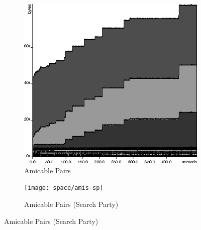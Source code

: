 \begin{figure}[t]
  \centering
  \begin{subfigure}{0.4\textwidth}
    \includegraphics[width=\textwidth]{space/amis-orig.eps}
    \caption{Amicable Pairs}
    \label{fig:searchparty-examples-space:amis-orig}
  \end{subfigure}
  \begin{subfigure}{0.4\textwidth}
    \texttt{[image: space/amis-sp]}
    \caption{Amicable Pairs (Search Party)}
    \label{fig:searchparty-examples-space:amis-sp}
  \end{subfigure}



\end{figure}
